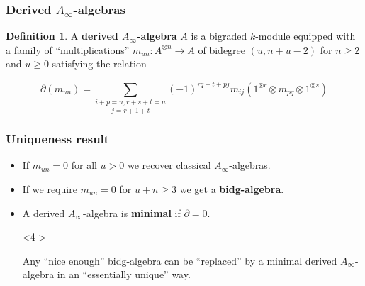\documentclass{beamer}
\theoremstyle{definition}
\newtheorem{defi}{Definition}
\begin{document}
\begin{frame}
\frametitle{Derived $A_\infty$-algebras}
\begin{defi}
A \textbf{derived $A_\infty$-algebra} $A$ is a bigraded $k$-module equipped with a family of ``multiplications'' $m_{un}:A^{\otimes n}\to A$ of bidegree $(u,n+u-2)$ for $n\geq 2$ and $u\geq 0$ satisfying the relation

\[\partial(m_{un})=\underset{j=r+1+t}{\sum_{i+p=u,r+s+t=n}}(-1)^{rq+t+pj}m_{ij}(1^{\otimes r}\otimes m_{pq}\otimes 1^{\otimes s})\] %
\end{defi}
\end{frame}


\begin{frame}
\frametitle{Uniqueness result}
\begin{itemize}
\item If $m_{un}=0$ for all $u>0$ we recover classical $A_\infty$-algebras.
\item<2-> If we require $m_{un}=0$ for $u+n\geq 3$ we get a \textbf{bidg-algebra}. %
\item<3-> A derived $A_\infty$-algebra is \textbf{minimal} if $\partial=0$. 
\item[]<4->
\begin{theorem}[Sagave]
Any ``nice enough'' bidg-algebra can be ``replaced'' by a minimal derived $A_\infty$-algebra in an ``essentially unique'' way.
\end{theorem}
\end{itemize}
\end{frame}
\end{document}
